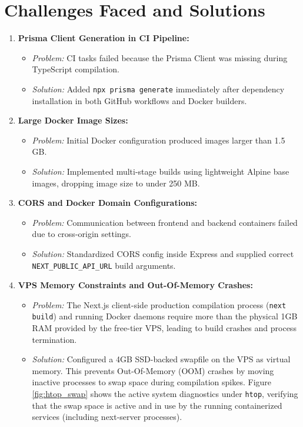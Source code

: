 \documentclass[12pt,a4paper]{article}
\begin{document}
\section{Challenges Faced and Solutions}
\begin{enumerate}
    \item \textbf{Prisma Client Generation in CI Pipeline:}
    \begin{itemize}
        \item \textit{Problem:} CI tasks failed because the Prisma Client was missing during TypeScript compilation.
        \item \textit{Solution:} Added \texttt{npx prisma generate} immediately after dependency installation in both GitHub workflows and Docker builders.
    \end{itemize}
    \item \textbf{Large Docker Image Sizes:}
    \begin{itemize}
        \item \textit{Problem:} Initial Docker configuration produced images larger than 1.5 GB.
        \item \textit{Solution:} Implemented multi-stage builds using lightweight Alpine base images, dropping image size to under 250 MB.
    \end{itemize}
    \item \textbf{CORS and Docker Domain Configurations:}
    \begin{itemize}
        \item \textit{Problem:} Communication between frontend and backend containers failed due to cross-origin settings.
        \item \textit{Solution:} Standardized CORS config inside Express and supplied correct \texttt{NEXT\_PUBLIC\_API\_URL} build arguments.
    \end{itemize}
    \item \textbf{VPS Memory Constraints and Out-Of-Memory Crashes:}
    \begin{itemize}
        \item \textit{Problem:} The Next.js client-side production compilation process (\texttt{next build}) and running Docker daemons require more than the physical 1GB RAM provided by the free-tier VPS, leading to build crashes and process termination.
        \item \textit{Solution:} Configured a 4GB SSD-backed swapfile on the VPS as virtual memory. This prevents Out-Of-Memory (OOM) crashes by moving inactive processes to swap space during compilation spikes. Figure \ref{fig:htop_swap} shows the active system diagnostics under \texttt{htop}, verifying that the swap space is active and in use by the running containerized services (including next-server processes).
    \end{itemize}
\end{enumerate}
\end{document}
